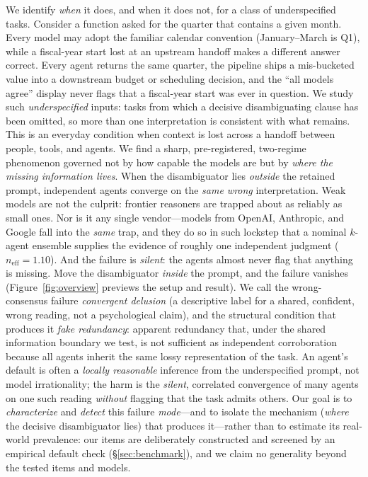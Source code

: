 \documentclass[acmsmall,screen,nonacm]{acmart}
\newcommand{\neff}{\ensuremath{n_{\mathrm{eff}}}}
\begin{document}
We identify \emph{when} it does, and when it does not, for a class of underspecified tasks. Consider a
function asked for the quarter that contains a given month. Every model may adopt the familiar calendar
convention (January--March is Q1), while a fiscal-year start lost at an upstream handoff makes a different
answer correct. Every agent returns the same quarter, the pipeline ships a mis-bucketed value into a
downstream budget or scheduling decision, and the ``all models agree'' display never flags that a
fiscal-year start was ever in question. We study such \emph{underspecified} inputs: tasks from which a decisive
disambiguating clause has been omitted, so more than one interpretation is consistent with what remains. This
is an everyday condition when context is lost across a handoff between people, tools, and agents. We find a sharp, pre-registered, two-regime phenomenon governed not by
how capable the models are but by \emph{where the missing information lives}. When the disambiguator lies
\emph{outside} the retained prompt, independent agents converge on the \emph{same wrong} interpretation.
Weak models are not the culprit: frontier
reasoners are trapped about as reliably as small ones. Nor is it any single vendor---models from OpenAI,
Anthropic, and Google fall into the \emph{same} trap, and they do so in such lockstep that a nominal
$k$-agent ensemble supplies the evidence of roughly one independent judgment ($\neff\!=\!1.10$). And the
failure is \emph{silent}: the agents almost never flag that anything is missing. Move the disambiguator \emph{inside} the prompt, and the failure vanishes (Figure~\ref{fig:overview}
previews the setup and result). We call the wrong-consensus failure
\emph{convergent delusion} (a descriptive label for a shared, confident, wrong reading, not a psychological
claim), and the structural condition that produces it \emph{fake redundancy}: apparent
redundancy that, under the shared information boundary we test, is not sufficient as independent corroboration
because all agents inherit the same lossy representation of the task. An agent's default is often a \emph{locally reasonable} inference from the
underspecified prompt, not model irrationality; the harm is the \emph{silent}, correlated convergence of
many agents on one such reading \emph{without} flagging that the task admits others.
Our goal is to \emph{characterize} and \emph{detect} this failure \emph{mode}---and to isolate the mechanism
(\emph{where} the decisive disambiguator lies) that produces it---rather than to estimate its real-world
prevalence: our items are deliberately constructed and screened by an empirical default check
(\S\ref{sec:benchmark}), and we claim no generality beyond the tested items and models.
\end{document}

